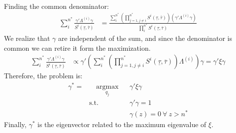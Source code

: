 \documentclass[12pt, a4paper]{article}
\begin{document}
Finding the common denominator:
\begin{equation*}
\begin{aligned}
\sum_i^{n^*}\frac{\gamma' \Lambda^{(i)} \gamma}{S^{i}(\underline{\tau},\overline{\tau})}
&=
\frac{\sum_i^{n^*} \left( \prod_{j=1,j\neq i}^{n^*} S^{i}(\underline{\tau},\overline{\tau})\right) \left( \gamma' \Lambda^{(i)} \gamma \right)}{\prod_i^{n^*} S^{i}(\underline{\tau},\overline{\tau})}
\end{aligned}
\end{equation*}
We realize that $\gamma$ are independent of the sum, and since the denominator is common we can retire it form the maximization.
\begin{equation*}
\begin{aligned}
\sum_i^{n^*}\frac{\gamma' \Lambda^{(i)} \gamma}{S^{i}(\underline{\tau},\overline{\tau})}
& \propto
\gamma' \left( \sum_i^{n^*} \left( \prod_{j=1,j\neq i}^{n^*}  S^{i}(\underline{\tau},\overline{\tau})\right) \Lambda^{(i)} \right) \gamma = \gamma' \xi  \gamma
\end{aligned}
\end{equation*}
Therefore, the problem is:
\begin{equation*}
\begin{aligned}
\gamma^* =  & \quad \underset{q_j}{\text{argmax}}
& & \gamma' \xi \gamma \\
& \text{s.t.}
& & \gamma' \gamma = 1\\
& & & \gamma(z) = 0 \ \forall \ z > n^*
\end{aligned}
\end{equation*}
Finally, $\gamma^*$ is the eigenvector related to the maximum eigenvalue of $\xi$.
\end{document}
